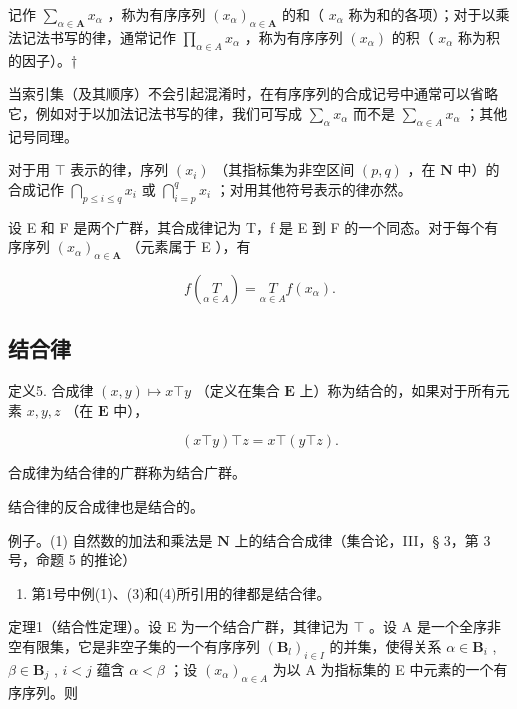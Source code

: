 记作 \(\sum_{\alpha \in \mathbf{A}} x_{\alpha}\) ，称为有序序列 \((x_{\alpha})_{\alpha \in \mathbf{A}}\) 的和（ \(x_{\alpha}\) 称为和的各项）；对于以乘法记法书写的律，通常记作 \(\prod_{\alpha \in A} x_{\alpha}\) ，称为有序序列 \((x_{\alpha})\) 的积（ \(x_{\alpha}\) 称为积的因子）。†

当索引集（及其顺序）不会引起混淆时，在有序序列的合成记号中通常可以省略它，例如对于以加法记法书写的律，我们可写成 \(\sum_{\alpha} x_{\alpha}\) 而不是 \(\sum_{\alpha \in A} x_{\alpha}\) ；其他记号同理。

对于用 \(\top\) 表示的律，序列 \((x_{i})\) （其指标集为非空区间 \((p,q)\) ，在 \(\mathbf{N}\) 中）的合成记作 \(\bigcap_{p\leqslant i\leqslant q}x_{i}\) 或 \(\bigcap_{i = p}^{q}x_{i}\) ；对用其他符号表示的律亦然。

设 E 和 F 是两个广群，其合成律记为 T，f 是 E 到 F 的一个同态。对于每个有序序列 \((x_{\alpha})_{\alpha \in \mathbf{A}}\) （元素属于 E ），有

\[
f \left(\underset {\alpha \in A} {T}\right) = \underset {\alpha \in A} {T} f (x _ {\alpha}).\tag{2}
\]

\subsection{结合律}

定义5. 合成律 \((x,y)\mapsto x\top y\) （定义在集合 \(\mathbf{E}\) 上）称为结合的，如果对于所有元素 \(x,y,z\) （在 \(\mathbf{E}\) 中），

\[
(x \top y) \top z = x \top (y \top z).
\]

合成律为结合律的广群称为结合广群。

结合律的反合成律也是结合的。

例子。(1) 自然数的加法和乘法是 \(\mathbf{N}\) 上的结合合成律（集合论，III，§ 3，第 3 号，命题 5 的推论）

\begin{enumerate}
\def\labelenumi{(\arabic{enumi})}
\setcounter{enumi}{1}
\tightlist
\item
  第1号中例(1)、(3)和(4)所引用的律都是结合律。
\end{enumerate}

定理1（结合性定理）。设 E 为一个结合广群，其律记为 \(\top\) 。设 A 是一个全序非空有限集，它是非空子集的一个有序序列 \((\mathbf{B}_l)_{i \in I}\) 的并集，使得关系 \(\alpha \in \mathbf{B}_i\) , \(\beta \in \mathbf{B}_j\) , \(i < j\) 蕴含 \(\alpha < \beta\) ；设 \((x_\alpha)_{\alpha \in A}\) 为以 A 为指标集的 E 中元素的一个有序序列。则

